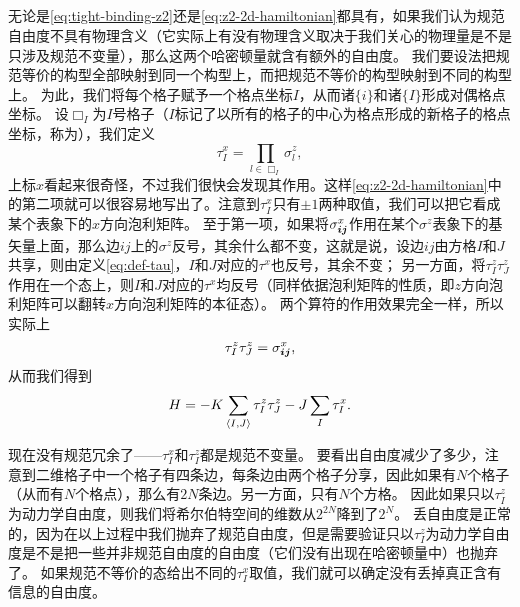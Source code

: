 \subsection{}

无论是\eqref{eq:tight-binding-z2}还是\eqref{eq:z2-2d-hamiltonian}都具有，如果我们认为规范自由度不具有物理含义（它实际上有没有物理含义取决于我们关心的物理量是不是只涉及规范不变量），那么这两个哈密顿量就含有额外的自由度。
我们要设法把规范等价的构型全部映射到同一个构型上，而把规范不等价的构型映射到不同的构型上。
为此，我们将每个格子赋予一个格点坐标$I$，从而诸$\{i\}$和诸$\{I\}$形成对偶格点坐标。
设$\Box_I$为$I$号格子（$I$标记了以所有的格子的中心为格点形成的新格子的格点坐标，称为），我们定义
\begin{equation}
    {\tau}^x_I = \prod_{l \in \Box_I} {\sigma}^z_l,
    \label{eq:def-tau}
\end{equation}
上标$x$看起来很奇怪，不过我们很快会发现其作用。这样\eqref{eq:z2-2d-hamiltonian}中的第二项就可以很容易地写出了。注意到$\tau^x_I$只有$\pm 1$两种取值，我们可以把它看成某个表象下的$x$方向泡利矩阵。
至于第一项，如果将${\sigma}_{\vb*{i} \vb*{j}}^x$作用在某个${\sigma}^z$表象下的基矢量上面，那么边$ij$上的$\sigma^z$反号，其余什么都不变，这就是说，设边$ij$由方格$I$和$J$共享，则由定义\eqref{eq:def-tau}，$I$和$J$对应的$\tau^x$也反号，其余不变；
另一方面，将${\tau}^z_I {\tau}^z_J$作用在一个态上，则$I$和$J$对应的$\tau^x$均反号（同样依据泡利矩阵的性质，即$z$方向泡利矩阵可以翻转$x$方向泡利矩阵的本征态）。
两个算符的作用效果完全一样，所以实际上
\begin{equation}
    {\tau}^z_I {\tau}^z_J = {\sigma}^x_{\vb*{i} \vb*{j}},
\end{equation}
从而我们得到
\begin{equation}
    {H} = - K \sum_{\langle I, J \rangle} {\tau}^z_I {\tau}^z_J - J \sum_{I} {\tau}^x_I.
    \label{eq:z2-2d-tau-hamiltonian}
\end{equation}

现在没有规范冗余了——${\tau}^x_{I}$和${\tau}^z_I$都是规范不变量。
要看出自由度减少了多少，注意到二维格子中一个格子有四条边，每条边由两个格子分享，因此如果有$N$个格子（从而有$N$个格点），那么有$2N$条边。另一方面，只有$N$个方格。
因此如果只以${\tau}^z_I$为动力学自由度，则我们将希尔伯特空间的维数从$2^{2N}$降到了$2^N$。
丢自由度是正常的，因为在以上过程中我们抛弃了规范自由度，但是需要验证只以${\tau}^z_I$为动力学自由度是不是把一些并非规范自由度的自由度（它们没有出现在哈密顿量中）也抛弃了。
如果规范不等价的态给出不同的${\tau}^x_I$取值，我们就可以确定没有丢掉真正含有信息的自由度。

